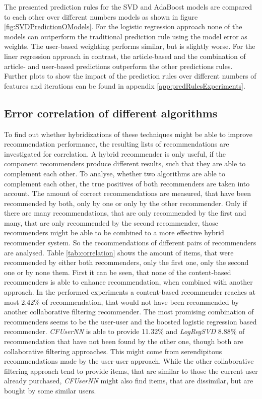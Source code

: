 \documentclass[10pt]{reportMaster}
\begin{document}
The presented prediction rules for the SVD and AdaBoost models are compared to each other over different numbers models as shown in figure \ref{fig:SVDPredictionOModels}. %
For the logistic regression approach none of the models can outperform the traditional prediction rule using the model error as weights.
The user-based weighting performs similar, but is slightly worse.
For the liner regression approach in contrast, the article-based and the combination of article- and user-based predictions outperform the other predictions rules.
Further plots to show the impact of the prediction rules over different numbers of features and iterations can be found in appendix \ref{app:predRulesExperiments}.




\subsection*{Error correlation of different algorithms}
To find out whether hybridizations of these techniques might be able to improve recommendation performance, the resulting lists of recommendations are investigated for correlation.
A hybrid recommender is only useful, if the component recommenders produce different results, such that they are able to complement each other.
To analyse, whether two algorithms are able to complement each other, the true positives of both recommenders are taken into account.
The amount of correct recommendations are measured, that have been recommended by both, only by one or only by the other recommender.
Only if there are many recommendations, that are only recommended by the first and many, that are only recommended by the second recommender, those recommenders might be able to be combined to a more effective hybrid recommender system.
So the recommendations of different pairs of recommenders are analysed.
Table \ref{tab:correlation} shows the amount of items, that were recommended by either both recommenders, only the first one, only the second one or by none them.
First it can be seen, that none of the content-based recommenders is able to enhance recommendation, when combined with another approach.
In the performed experiments a content-based recommender reaches at most 2.42\% of recommendation, that would not have been recommended by another collaborative filtering recommender.
The most promising combination of recommenders seems to be the user-user and the boosted logistic regression based recommender.
\textit{CFUserNN} is able to provide 11.32\% and \textit{LogRegSVD} 8.88\% of recommendation that have not been found by the other one, though both are collaborative filtering approaches.
This might come from serendipitous recommendations made by the user-user approach.
While the other collaborative filtering approach tend to provide items, that are similar to those the current user already purchased, \textit{CFUserNN} might also find items, that are dissimilar, but are bought by some similar users.
\end{document}
